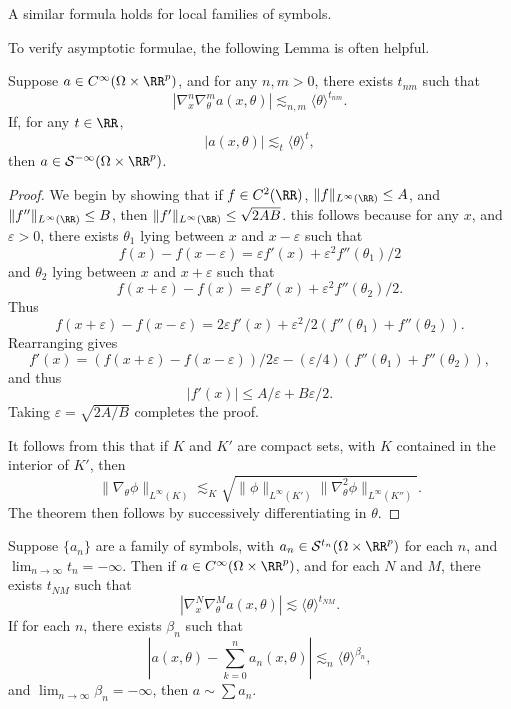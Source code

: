 \begin{remark}
    A similar formula holds for local families of symbols.
\end{remark}

To verify asymptotic formulae, the following Lemma is often helpful.

\begin{lemma}
    Suppose $a \in C^\infty(\Omega \times \RR^p)$, and for any $n,m > 0$, there exists $t_{nm}$ such that
    \[ |\nabla^n_x \nabla^m_\theta a(x,\theta)| \lesssim_{n,m} \langle \theta \rangle^{t_{nm}}. \]
    If, for any $t \in \RR$,
    \[ |a(x,\theta)| \lesssim_t \langle \theta \rangle^t, \]
    then $a \in \mathcal{S}^{-\infty}(\Omega \times \RR^p)$.
\end{lemma}
\begin{proof}
    We begin by showing that if $f \in C^2(\RR)$, $\| f \|_{L^\infty(\RR)} \leq A$, and $\| f'' \|_{L^\infty(\RR)} \leq B$, then $\| f' \|_{L^\infty(\RR)} \leq \sqrt{2AB}$. this follows because for any $x$, and $\varepsilon > 0$, there exists $\theta_1$ lying between $x$ and $x - \varepsilon$ such that
    \[ f(x) - f(x-\varepsilon) = \varepsilon f'(x) + \varepsilon^2 f''(\theta_1) / 2 \]
    and $\theta_2$ lying between $x$ and $x + \varepsilon$ such that
    \[ f(x + \varepsilon) - f(x) = \varepsilon f'(x) + \varepsilon^2 f''(\theta_2)/2. \]
    Thus
    \[ f(x+\varepsilon) - f(x-\varepsilon) = 2 \varepsilon f'(x) + \varepsilon^2 / 2 (f''(\theta_1) + f''(\theta_2)). \]
    Rearranging gives
    \[ f'(x) = (f(x+\varepsilon) - f(x-\varepsilon))/2 \varepsilon - (\varepsilon / 4)(f''(\theta_1) + f''(\theta_2)), \]
    and thus
    \[ |f'(x)| \leq A/\varepsilon + B \varepsilon / 2. \]
    Taking $\varepsilon = \sqrt{2A/B}$ completes the proof.

    It follows from this that if $K$ and $K'$ are compact sets, with $K$ contained in the interior of $K'$, then
    \[ \| \nabla_\theta \phi \|_{L^\infty(K)} \lesssim_K \sqrt{\| \phi \|_{L^\infty(K')} \| \nabla_\theta^2 \phi \|_{L^\infty(K'')} }. \]
    The theorem then follows by successively differentiating in $\theta$.
\end{proof}

\begin{corollary}
    Suppose $\{ a_n \}$ are a family of symbols, with $a_n \in \mathcal{S}^{t_n}(\Omega \times \RR^p)$ for each $n$, and $\lim_{n \to \infty} t_n = -\infty$. Then if $a \in C^\infty(\Omega \times \RR^p)$, and for each $N$ and $M$, there exists $t_{NM}$ such that
    \[ |\nabla^N_x \nabla^M_\theta a(x,\theta)| \lesssim \langle \theta \rangle^{t_{NM}}. \]
    If for each $n$, there exists $\beta_n$ such that
    \[ |a(x,\theta) - \sum_{k = 0}^n a_n(x,\theta)| \lesssim_n \langle \theta \rangle^{\beta_n}, \]
    and $\lim_{n \to \infty} \beta_n = -\infty$, then $a \sim \sum a_n$.
\end{corollary}

